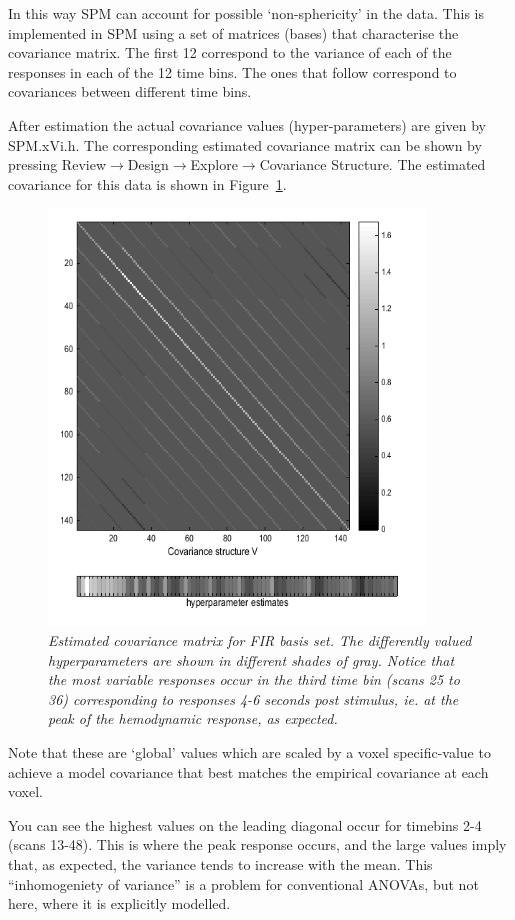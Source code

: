 \documentclass[a4paper,titlepage]{book}
\begin{document}
In this way SPM can account for possible `non-sphericity' in the data. This is implemented in SPM using a set of matrices (bases) that characterise the covariance matrix. The first 12 correspond to the variance of each of the responses in 
each of the 12 time bins. The ones that follow  correspond to covariances between different time bins.

After estimation the actual covariance values (hyper-parameters) are given by SPM.xVi.h. The corresponding estimated 
covariance matrix can be shown by pressing Review$\rightarrow$Design$\rightarrow$Explore$\rightarrow$Covariance Structure. The estimated covariance for this data is shown in Figure~\ref{fir_covariance}.
\begin{figure}
\begin{center}
\includegraphics[width=100mm]{faces_group/fir_covariance}
\caption{\em Estimated covariance matrix for FIR basis set. The differently valued hyperparameters are shown in different shades of gray. Notice that the most variable responses occur in the third time bin (scans 25 to 36) corresponding to responses 4-6 seconds post stimulus, ie. at the peak of the hemodynamic response, as expected. \label{fir_covariance}}
\end{center}
\end{figure}
Note that these are `global' values which are scaled by a voxel specific-value to achieve a model covariance that best matches the empirical covariance at each voxel. 

You can see the highest values on the leading diagonal occur for timebins 2-4 (scans 13-48). This is where the peak response occurs, and the large values imply that, as expected, the variance tends to increase with the mean. This ``inhomogeniety of variance'' is a problem for conventional ANOVAs, but not here, where it is explicitly modelled.
\end{document}

